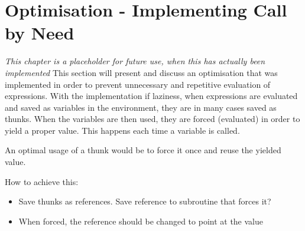 \chapter{Optimisation - Implementing Call by Need}
\textit{This chapter is a placeholder for future use, when this has actually been implemented}
This section will present and discuss an optimisation that was implemented in
order to prevent unnecessary and repetitive evaluation of expressions.
With the implementation if laziness, when expressions are evaluated and saved as
variables in the environment, they are in many cases saved as thunks. When the
variables are then used, they are forced (evaluated) in order to yield a proper
value. This happens each time a variable is called.

An optimal usage of a thunk would be to force it once and reuse the yielded
value.

How to achieve this:
\begin{itemize}
\item Save thunks as references. Save reference to subroutine that forces it?
\item When forced, the reference should be changed to point at the value
\end{itemize}

